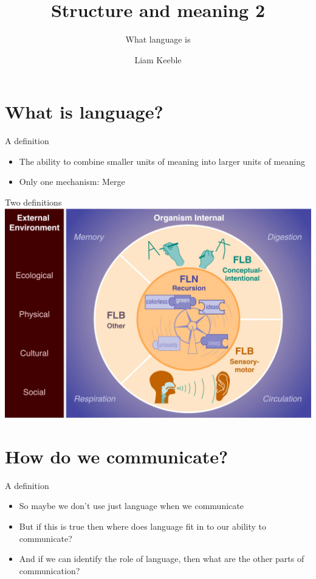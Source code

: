 \documentclass{beamer}
\title{Structure and meaning 2}
\subtitle{What language is}
\author{Liam Keeble}
\institute{School of English Literature, Language and Linguistics}
\date{}
\begin{document}
\frame{\titlepage}

\section{What is language?}

\begin{frame}{A definition}
	\begin{itemize}
	\item The ability to combine smaller units of meaning into larger units of meaning
	\item Only one mechanism: Merge \cite{hauser2002faculty,fitch2004computational}
	
	\end{itemize}
\end{frame}


\begin{frame}{Two definitions}
	\includegraphics[scale=0.2]{FLN.jpg}
	\nocite{hauser2002faculty}
\end{frame}



\section{How do we communicate?}

\begin{frame}{A definition}
	\begin{itemize}
	\item So maybe we don't use just language when we communicate
	\item But if this is true then where does language fit in to our ability to communicate?
	\item And if we can identify the role of language, then what are the other parts of communication?
	
	\end{itemize}


\end{frame}
\end{document}
